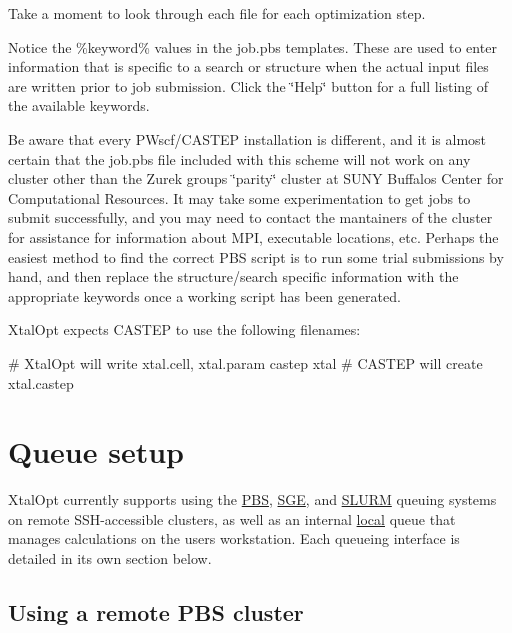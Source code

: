 Take a moment to look through each file for each optimization step.

Notice the \%keyword\% values in the job.\+pbs templates. These are used to enter information that is specific to a search or structure when the actual input files are written prior to job submission. Click the \char`\"{}\+Help\char`\"{} button for a full listing of the available keywords.

Be aware that every P\+Wscf/\+C\+A\+S\+T\+E\+P installation is different, and it is almost certain that the job.\+pbs file included with this scheme will not work on any cluster other than the Zurek group\textquotesingle{}s \char`\"{}parity\char`\"{} cluster at S\+U\+N\+Y Buffalo\textquotesingle{}s Center for Computational Resources. It may take some experimentation to get jobs to submit successfully, and you may need to contact the mantainers of the cluster for assistance for information about M\+P\+I, executable locations, etc. Perhaps the easiest method to find the correct P\+B\+S script is to run some trial submissions by hand, and then replace the structure/search specific information with the appropriate keywords once a working script has been generated.

Xtal\+Opt expects C\+A\+S\+T\+E\+P to use the following filenames\+:


\begin{DoxyCode}
\textcolor{preprocessor}{# XtalOpt will write xtal.cell, xtal.param}
castep xtal
\textcolor{preprocessor}{# CASTEP will create xtal.castep}
\end{DoxyCode}
\hypertarget{tut-xo_qisetup}{}\section{Queue setup}\label{tut-xo_qisetup}
Xtal\+Opt currently supports using the \hyperlink{tut-xo_remotepbs}{P\+B\+S}, \hyperlink{tut-xo_remotesge}{S\+G\+E}, and \hyperlink{tut-xo_remoteslurm}{S\+L\+U\+R\+M} queuing systems on remote S\+S\+H-\/accessible clusters, as well as an internal \hyperlink{tut-xo_localqi}{local} queue that manages calculations on the user\textquotesingle{}s workstation. Each queueing interface is detailed in its own section below.\hypertarget{tut-xo_remotepbs}{}\subsection{Using a remote P\+B\+S cluster}\label{tut-xo_remotepbs}
 
